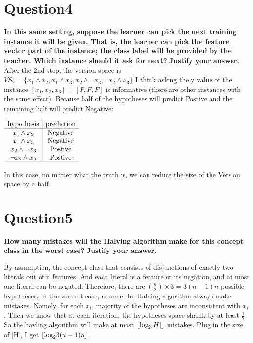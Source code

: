 \documentclass[paper=a4, fontsize=11pt]{scrartcl} %
\DeclarePairedDelimiter\floor{\lfloor}{\rfloor}
\numberwithin{equation}{section} %
\numberwithin{figure}{section} %
\numberwithin{table}{section} %
\begin{document}
\newpage
\section*{Question4}
\textbf{In this same setting, suppose the learner can pick the next training instance it will be given. That is, the learner can pick the feature vector part of the instance; the class label will be provided by the teacher. Which instance should it ask for next? Justify your answer.}
\bigbreak 
After the 2nd step, the version space is $VS_2 = 
\{
x_1 \land x_2, x_1 \land x_3, 
x_2 \land \neg x_3,
\neg x_2 \land x_3
\}$
\smallbreak
I think asking the y value of the instance $[x_1,x_2,x_3] = [F,F,F]$ is informative (there are other instances with the same effect). Because half of the hypotheses will predict Postive and the remaining half will predict Negative:  

\begin{center}
$
\begin{array}{c|c}
\hline
\text{hypothesis} & \text{prediction} \\
\hline
x_1 \land x_2 & \text{Negative} \\ 
x_1 \land x_3 & \text{Negative}  \\ 
x_2 \land \neg x_3 & \text{Postive} \\ 
\neg x_2 \land x_3 & \text{Postive}  \\ 
\hline
\end{array}
$
\end{center}

In this case, no matter what the truth is, we can reduce the size of the Version space by a half. 

\newpage
\section*{Question5}
\textbf{How many mistakes will the Halving algorithm make for this concept class in the worst case? Justify your answer.}
\bigbreak 


By assumption, the concept class that consists of disjunctions of exactly two literals out of n features. And each literal is a feature or its negation, and at most one literal can be negated. Therefore, there are 
$
{{n}\choose{2}} \times 3 = 3(n-1)n
$
possible hypotheses. 
\smallbreak
In the worsest case, assume the Halving algorithm always make mistakes. Namely, for each $x_i$, majority of the hypotheses are inconsistent with $x_i$. Then we know that at each iteration, the hypotheses space shrink by at least $\frac{1}{2}$. So the havling algorithm will make at most  $\floor*{\text{log}_2 |H|}$ mistakes. Plug in the size of |H|, I get $\floor*{\text{log}_2 3(n-1)n}$. 
\bigbreak
\end{document}
